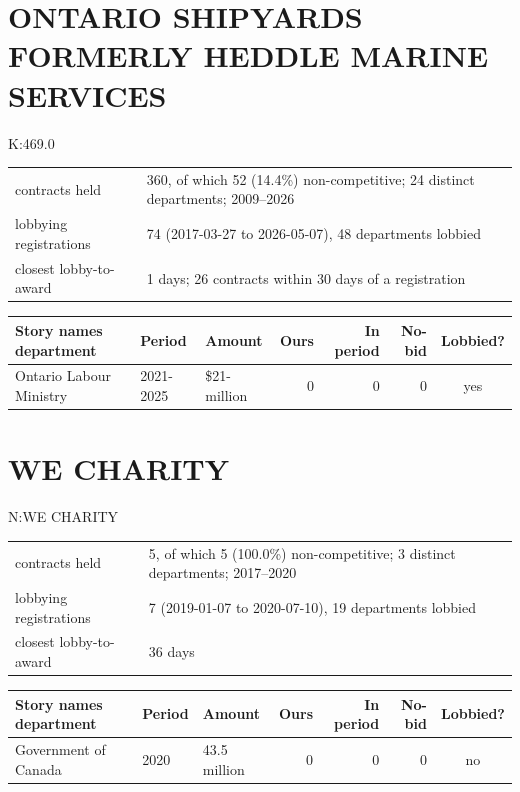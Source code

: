 \documentclass[10pt,a4paper]{article}
\newcommand{\lbl}[1]{{\color{slate}\ttfamily\scriptsize #1}}
\begin{document}
\section*{ONTARIO SHIPYARDS FORMERLY HEDDLE MARINE SERVICES}
\lbl{K:469.0}\par
{\small\begin{tabular}{@{}p{3.6cm}p{12.6cm}@{}}
contracts held & 360, of which 52 (14.4\%) non-competitive; 24 distinct departments; 2009--2026\\
lobbying registrations & 74 (2017-03-27 to 2026-05-07), 48 departments lobbied\\
closest lobby-to-award & 1 days; 26 contracts within 30 days of a registration\\
\end{tabular}}\par\vspace{0.35em}
{\small\begin{tabular}{@{}p{5.0cm}p{1.5cm}p{1.8cm}rrrc@{}}
\toprule
\textbf{Story names department} & \textbf{Period} & \textbf{Amount} & \textbf{Ours} & \textbf{In period} & \textbf{No-bid} & \textbf{Lobbied?}\\
\midrule
Ontario Labour Ministry & 2021-2025 & \$21-million & 0 & 0 & 0 & yes\\
\bottomrule\end{tabular}}\par
\section*{WE CHARITY}
\lbl{N:WE CHARITY}\par
{\small\begin{tabular}{@{}p{3.6cm}p{12.6cm}@{}}
contracts held & 5, of which 5 (100.0\%) non-competitive; 3 distinct departments; 2017--2020\\
lobbying registrations & 7 (2019-01-07 to 2020-07-10), 19 departments lobbied\\
closest lobby-to-award & 36 days\\
\end{tabular}}\par\vspace{0.35em}
{\small\begin{tabular}{@{}p{5.0cm}p{1.5cm}p{1.8cm}rrrc@{}}
\toprule
\textbf{Story names department} & \textbf{Period} & \textbf{Amount} & \textbf{Ours} & \textbf{In period} & \textbf{No-bid} & \textbf{Lobbied?}\\
\midrule
Government of Canada & 2020 & 43.5 million & 0 & 0 & 0 & no\\
\bottomrule\end{tabular}}\par
\end{document}
